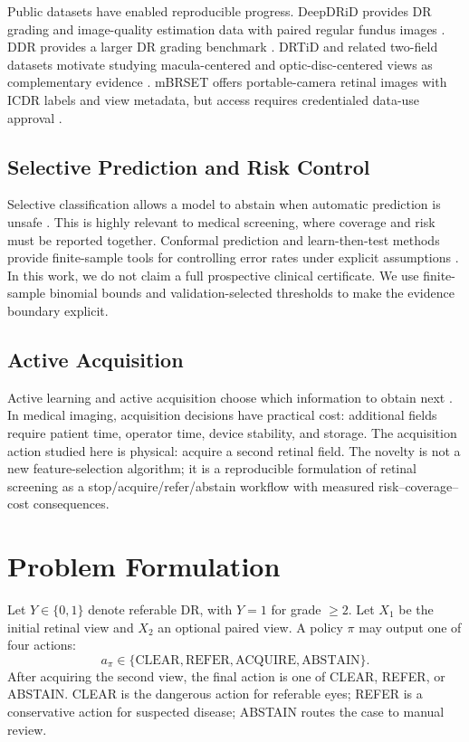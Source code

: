 \documentclass[journal]{IEEEtran}
\begin{document}
Public datasets have enabled reproducible progress. DeepDRiD provides DR grading and image-quality estimation data with paired regular fundus images \cite{deepdrid}. DDR provides a larger DR grading benchmark \cite{ddr}. DRTiD and related two-field datasets motivate studying macula-centered and optic-disc-centered views as complementary evidence \cite{drtid}. mBRSET offers portable-camera retinal images with ICDR labels and view metadata, but access requires credentialed data-use approval \cite{mbrset}.

\subsection{Selective Prediction and Risk Control}
Selective classification allows a model to abstain when automatic prediction is unsafe \cite{selective,selectivenet}. This is highly relevant to medical screening, where coverage and risk must be reported together. Conformal prediction and learn-then-test methods provide finite-sample tools for controlling error rates under explicit assumptions \cite{vovk2005,angelopoulos2021,angelopoulos2024}. In this work, we do not claim a full prospective clinical certificate. We use finite-sample binomial bounds and validation-selected thresholds to make the evidence boundary explicit.

\subsection{Active Acquisition}
Active learning and active acquisition choose which information to obtain next \cite{gal2017,settles2009}. In medical imaging, acquisition decisions have practical cost: additional fields require patient time, operator time, device stability, and storage. The acquisition action studied here is physical: acquire a second retinal field. The novelty is not a new feature-selection algorithm; it is a reproducible formulation of retinal screening as a stop/acquire/refer/abstain workflow with measured risk--coverage--cost consequences.

\section{Problem Formulation}
Let $Y\in\{0,1\}$ denote referable DR, with $Y=1$ for grade $\geq2$. Let $X_1$ be the initial retinal view and $X_2$ an optional paired view. A policy $\pi$ may output one of four actions:
\[
  a_\pi \in \{\mathrm{CLEAR},\mathrm{REFER},\mathrm{ACQUIRE},\mathrm{ABSTAIN}\}.
\]
After acquiring the second view, the final action is one of CLEAR, REFER, or ABSTAIN. CLEAR is the dangerous action for referable eyes; REFER is a conservative action for suspected disease; ABSTAIN routes the case to manual review.
\end{document}
